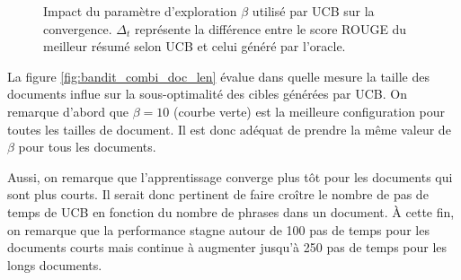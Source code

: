 \begin{figure}[h!]
    \begin{center}
    \end{center}
    \caption{Impact du paramètre d'exploration $\beta$ utilisé par UCB sur la convergence.
    $\Delta_t$ représente la différence entre le score ROUGE du meilleur résumé selon UCB et 
    celui généré par l'oracle.}
    \label{fig:bandit_combi_alpha}
\end{figure}

La figure \ref{fig:bandit_combi_doc_len} évalue dans quelle mesure la taille des documents
influe sur la sous-optimalité des cibles générées par UCB.
On remarque d'abord que $\beta=10$ (courbe verte) est la meilleure configuration pour toutes les tailles
de document.
Il est donc adéquat de prendre la même valeur de $\beta$ pour tous les documents.

Aussi, on remarque que l'apprentissage converge plus tôt pour les documents qui sont
plus courts.
Il serait donc pertinent de faire croître le nombre de pas de temps de UCB en fonction du nombre de
phrases dans un document.
À cette fin, on remarque que la performance stagne autour de 100 pas de temps pour les documents 
courts mais continue à augmenter jusqu'à 250 pas de temps pour les longs documents.

